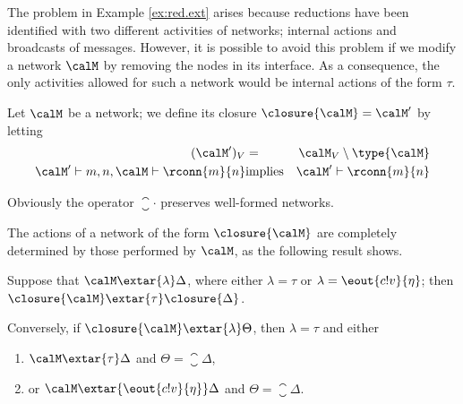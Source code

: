 \documentclass{LMCS}
\begin{document}
The problem in Example \ref{ex:red.ext} arises because reductions 
have been identified with two different activities of 
networks; internal actions and broadcasts of messages. 
However, it is possible to avoid this problem if we 
modify a network $\calM$ by removing the nodes in its 
interface. As a consequence, the only activities allowed 
for such a network would be internal actions of the 
form $\tau$.

\begin{defi}
\label{def:net.closure}
Let $\calM$ be a network; we define its closure 
$\closure{\calM} = \calM'$ by letting 
\begin{eqnarray*}
(\calM')_V &=& \calM_V \setminus \type{\calM}\\
\calM' \vdash m, n, \calM \vdash \rconn{m}{n} &\mbox{implies}& \calM' \vdash \rconn{m}{n} 
\end{eqnarray*}
\end{defi}
\noindent 
Obviously the operator $\closure{\cdot}$ preserves well-formed networks.

The actions of a network of the form $\closure{\calM}$ are completely 
determined by those performed by $\calM$, as the following result shows. 
\begin{prop}
\label{prop:ext.closure}
Suppose that $\calM \extar{\lambda} \Delta$, where 
either $\lambda = \tau$ or $\lambda = \eout{c!v}{\eta}$; 
then $\closure{\calM} \extar{\tau} \closure{\Delta}$. 

Conversely, if $\closure{\calM} \extar{\lambda} \Theta$, then 
$\lambda = \tau$ and either 
\begin{enumerate}[label=(\roman*)]
\item $\calM \extar{\tau} \Delta$ and $\Theta = \closure{\Delta}$, 
\item or $\calM \extar{\eout{c!v}{\eta}} \Delta$ and $\Theta = \closure{\Delta}$.
\end{enumerate}
\end{prop}
\end{document}
